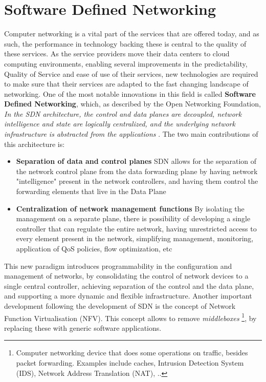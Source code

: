 \section{Software Defined Networking} \label{chap:sdn}

Computer networking is a vital part of the services that are offered today, and as such, the performance in technology backing these is central to the
quality of these services. As the service providers move their data centers to cloud computing environments, enabling several improvements in the predictability,
Quality of Service and ease of use of their services, new technologies are required to make sure that their services are adapted to the fast changing landscape of 
networking. One of the most notable innovations in this field is called \textbf{Software Defined Networking}, which, as described by the Open Networking
Foundation, \textit{ In the SDN architecture, the control and data planes are decoupled, network intelligence and state are logically centralized, and the underlying
network infrastructure is abstracted from the applications} \cite{open_networking_foundation_sdn_2014}. 
The two main contributions of this architecture is:

\begin {itemize}
    \item \textbf{Separation of data and control planes} SDN allows for the separation of the network control plane from the data forwarding plane by having network
        "intelligence" present in the network controllers, and having them control the forwarding elements that live in the Data Plane
    \item \textbf{Centralization of network management functions} By isolating the management on a separate plane, there is possibility of developing a single
        controller that can regulate the entire network, having unrestricted access to every element present in the network, simplifying management, monitoring,
        application of QoS policies, flow optimization, etc
\end {itemize}

\par This new paradigm introduces programmability in the configuration and management of networks, by consolidating the control of network devices to a single
central controller, achieving separation of the control and the data plane, and supporting a more dynamic and flexible infrastructure. Another important development
following the development of SDN is the concept of Network Function Virtualisation (NFV). This concept allows to remove \textit {middleboxes}
\footnote {Computer networking device that does some operations on traffic, besides packet forwarding. Examples include caches, Intrusion Detection System (IDS),
Network Address Translation (NAT), ..}, by replacing these with generic software applications.

